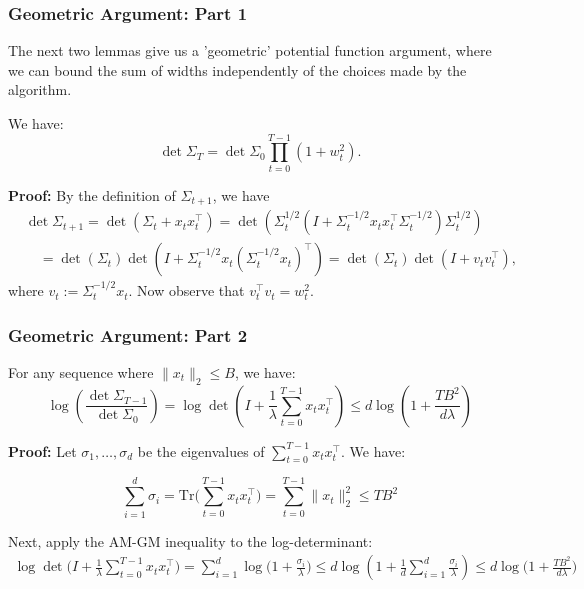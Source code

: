 \documentclass[aspectratio=169]{beamer}
\begin{document}
\begin{frame}\frametitle{Geometric Argument: Part 1}

The next two lemmas give us a 'geometric' potential function argument,
where we can bound the sum of widths independently of
the choices made by the algorithm. 

\pause
\begin{lemma} \label{lem:volumechange}
We have:
\[
\det \Sigma_{T} = \det \Sigma_{0}\prod_{t = 0}^{T-1} (1 + w_t^2).
\]
\end{lemma}

\pause
\textbf{Proof:}
By the definition of $\Sigma_{t+1}$, we have
\begin{align*}
&\det \Sigma_{t+1}  = \det (\Sigma_t + x_t x_t^\top )
 = \det ( \Sigma_t^{1/2} (I + \Sigma_t^{-1/2}x_t x_t^\top \Sigma_t^{-1/2}) \Sigma_t^{1/2}) \\
& \quad = \det(\Sigma_t) \det (I + \Sigma_t^{-1/2}x_t (\Sigma_t^{-1/2}x_t)^\top ) 
 = \det(\Sigma_t) \det(I + v_t v_t^\top ),
\end{align*}
where $v_t := \Sigma_t^{-1/2}x_t$. 
Now observe that $v_t^\top v_t = w_t^2$.

\end{frame}

\begin{frame}\frametitle{Geometric Argument: Part 2}
\vspace*{-0.1cm}
\begin{lemma}\label{lem:detA}
For any sequence where $\|x_t\|_2 \leq B$, we have: 
\[
\log\left(\frac{\det \Sigma_{T-1}}{\det \Sigma_{0}}\right) = \log\det\left( I + \frac{1}{\lambda} \sum_{t=0}^{T-1}x_t x_t^{\top}\right) \leq d\log\left( 1 + \frac{TB^2}{ d \lambda } \right)
\]
\end{lemma}

\pause
{\small 
\textbf{Proof:}
Let $\sigma_1, \dots, \sigma_d$ be the eigenvalues of
$\sum_{t=0}^{T-1}x_t x_t^{\top}$.  We have:

\[
\sum_{i=1}^d \sigma_i = \mathrm{Tr}\Big( \sum_{t=0}^{T-1}x_t x_t^{\top} \Big) = \sum_{t=0}^{T-1}\|x_t\|_2^2 \leq T B^2
\]

\pause
Next, apply the AM-GM inequality to the log-determinant:
\begin{align*}
\log\det\Big( I + \frac{1}{\lambda} \sum_{t=0}^{T-1}x_t x_t^{\top}\Big) = \sum_{i=1}^d \log\Big(1 + \frac{\sigma_i}{\lambda}\Big) 
\leq d\log\left( 1 + \frac{1}{d}\sum_{i=1}^d\frac{\sigma_i}{\lambda} \right) \leq d \log\Big( 1 + \frac{ TB^2 }{d\lambda} \Big)
\end{align*}
}
\end{frame}
\end{document}
